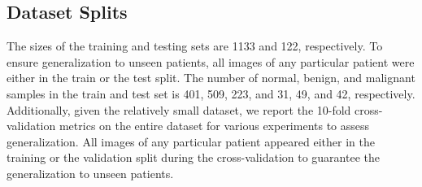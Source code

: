 \subsection{Dataset Splits}
%
The sizes of the training and testing sets are 1133 and 122, respectively. To ensure generalization to unseen patients, all images of any particular patient were either in the train or the test split. The number of normal, benign, and malignant samples in the train and test set is 401, 509, 223, and 31, 49, and 42, respectively. Additionally, given the relatively small dataset, we report the 10-fold cross-validation metrics on the entire dataset for various experiments to assess generalization. All images of any particular patient appeared either in the training or the validation split during the cross-validation to guarantee the generalization to unseen patients.

%


